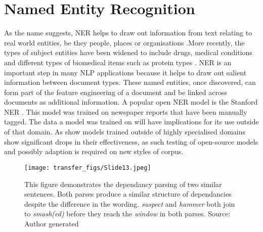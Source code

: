 \section{Named Entity Recognition} As the name suggests, NER helps to draw out information from text relating to real world entities, be they people, places or organisations  \parencite{eisenstein2018natural}.More recently, the types of subject entities have been widened to include drugs, medical conditions and different types of biomedical items such as protein types  \parencite{goyal2018recent}. NER is an important step in many NLP applications because it helps to draw out salient information between document types. These named entities, once discovered, can form part of the feature engineering of a document and be linked across documents as additional information. A popular open NER model is the Stanford NER \parencite{finkel2005incorporating}. This model was trained on newspaper reports that have been manually tagged. The data a model was trained on will have implications for its use outside of that domain. As \textcite{prokofyev2014effective} show models trained outside of highly specialised domains show significant drops in their effectiveness, as such testing of open-source models and possibly adaption is required on new styles of corpus.


\begin{figure}
  \texttt{[image: transfer\_figs/Slide13.jpeg]}
  \caption[Sentence Dependancy Parse.]{This figure demonstrates the dependancy parsing of two similar sentences. Both parses produce a similar structure of dependancies despite the difference in the wording. \emph{suspect} and \emph{hammer} both join to \emph{smash(ed)} before they reach the \emph{window} in both parses. Source: Author generated}
  \label{fig:dep}
\end{figure}


